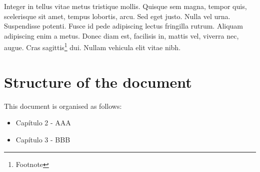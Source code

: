 Integer in tellus vitae metus tristique mollis. Quisque sem magna, tempor quis, scelerisque sit amet, tempus lobortis, arcu. Sed eget justo. Nulla vel urna. Suspendisse potenti. Fusce id pede adipiscing lectus fringilla rutrum. Aliquam adipiscing enim a metus. Donec diam est, facilisis in, mattis vel, viverra nec, augue. Cras sagittis\footnote{Footnote} dui. Nullam vehicula elit vitae nibh. 

\section{Structure of the document}
This document is organised as follows:
\begin{itemize}
	\item Capítulo 2 - AAA
	\item Capítulo 3 - BBB
\end{itemize}
